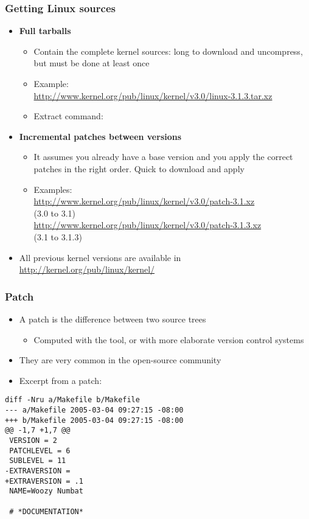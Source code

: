 \begin{frame}
  \frametitle{Getting Linux sources}
  \begin{itemize}
  \item {\bf Full tarballs}
    \begin{itemize}
    \item Contain the complete kernel sources: long to download and
      uncompress, but must be done at least once
    \item Example:\\
      \footnotesize
      \url{http://www.kernel.org/pub/linux/kernel/v3.0/linux-3.1.3.tar.xz}
      \normalsize
    \item Extract command:\\
      \footnotesize
      \normalsize
    \end{itemize}
  \item {\bf Incremental patches between versions}
    \begin{itemize}
    \item It assumes you already have a base version and you apply the
      correct patches in the right order. Quick to download and apply
    \item Examples:\\
      \scriptsize
      \url{http://www.kernel.org/pub/linux/kernel/v3.0/patch-3.1.xz}\\(3.0 to 3.1)\\
      \url{http://www.kernel.org/pub/linux/kernel/v3.0/patch-3.1.3.xz}\\(3.1 to 3.1.3)
    \end{itemize}
  \item All previous kernel versions are available in
    \url{http://kernel.org/pub/linux/kernel/}
  \end{itemize}
\end{frame}

\begin{frame}[fragile]
  \frametitle{Patch}
  \begin{itemize}
  \item A patch is the difference between two source trees
    \begin{itemize}
    \item Computed with the  tool, or with more elaborate
      version control systems
    \end{itemize}
  \item They are very common in the open-source community
  \item Excerpt from a patch:
  \end{itemize}
\footnotesize
\begin{verbatim}
diff -Nru a/Makefile b/Makefile
--- a/Makefile 2005-03-04 09:27:15 -08:00
+++ b/Makefile 2005-03-04 09:27:15 -08:00
@@ -1,7 +1,7 @@
 VERSION = 2
 PATCHLEVEL = 6
 SUBLEVEL = 11
-EXTRAVERSION =
+EXTRAVERSION = .1
 NAME=Woozy Numbat

 # *DOCUMENTATION*
\end{verbatim}
\end{frame}

